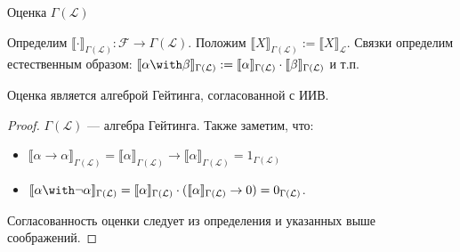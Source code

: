 \documentclass[aspectratio=169]{beamer}
\begin{document}
\begin{frame}{Оценка $\Gamma(\mathcal{L})$}
\begin{defrus}
Определим $\llbracket\cdot\rrbracket_{\Gamma(\mathcal{L})} : \mathcal{F} \rightarrow \Gamma(\mathcal{L})$.
Положим $\llbracket X \rrbracket_{\Gamma(\mathcal{L})} := \llbracket X \rrbracket_\mathcal{L}$.
Связки определим естественным образом:
$\llbracket \alpha\with\beta \rrbracket_{\Gamma(\mathcal{L})} := \llbracket \alpha\rrbracket_{\Gamma(\mathcal{L})}\cdot\llbracket\beta \rrbracket_{\Gamma(\mathcal{L})}$
и т.п.
\end{defrus}
\begin{thmrus}
Оценка является алгеброй Гейтинга, согласованной с ИИВ.
\end{thmrus}
\begin{proof}
$\Gamma(\mathcal{L})$ --- алгебра Гейтинга.
Также заметим, что:
\begin{itemize}
\item $\llbracket \alpha\rightarrow\alpha \rrbracket_{\Gamma(\mathcal{L})} = \llbracket \alpha\rrbracket_{\Gamma(\mathcal{L})}\rightarrow\llbracket\alpha \rrbracket_{\Gamma(\mathcal{L})}
= 1_{\Gamma(\mathcal{L})}$
\item $\llbracket \alpha\with\neg\alpha \rrbracket_{\Gamma(\mathcal{L})} = \llbracket \alpha\rrbracket_{\Gamma(\mathcal{L})} \cdot (\llbracket \alpha\rrbracket_{\Gamma(\mathcal{L})}\rightarrow 0)
= 0_{\Gamma(\mathcal{L})}$.
\end{itemize}

Согласованность оценки следует из определения и указанных выше соображений.
\end{proof}
\end{frame}
\end{document}

